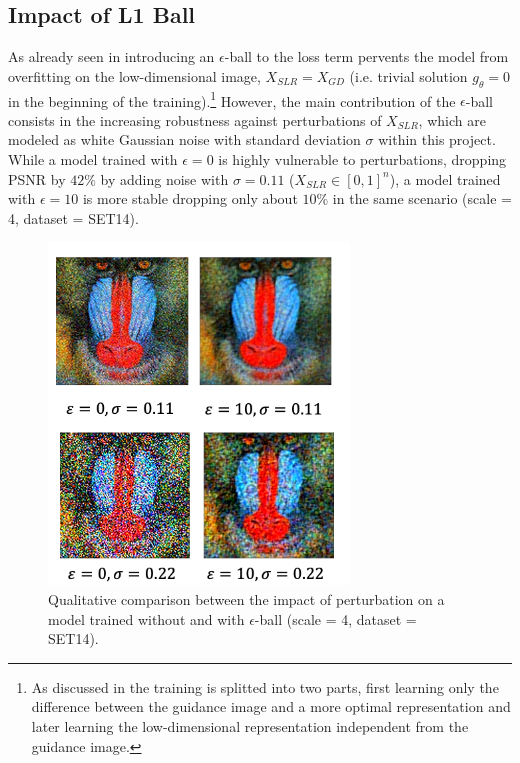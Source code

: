 \subsection{Impact of L1 Ball}
\label{sec:Experiments_EPS_BALL}
As already seen in  introducing an $\epsilon$-ball
to the loss term pervents the model from overfitting on the low-dimensional
image, $X_{SLR} = X_{GD}$ (i.e. trivial solution $g_\theta = 0$ in the
beginning of the training).\footnote{As discussed in 
the training is splitted into two parts, first learning only the difference
between the guidance image and a more optimal representation and later
learning the low-dimensional representation independent from the guidance
image.} However, the main contribution of the $\epsilon$-ball consists in the
increasing robustness against perturbations of $X_{SLR}$, which are modeled
as white Gaussian noise with standard deviation $\sigma$ within this project.
While a model trained with $\epsilon = 0$ is highly vulnerable to perturbations,
dropping \ac{PSNR} by $42 \%$ by adding noise with $\sigma = 0.11$ ($X_{SLR} \in
[0,1]^n$), a model trained with $\epsilon = 10$ is more stable dropping only
about $10 \%$ in the same scenario (scale = 4, dataset = SET14).

\begin{figure}[!htbp]
	\centering
	\includegraphics[width=8cm]{figures/epsball_qualitative_comp}
	\caption{Qualitative comparison between the impact of perturbation on a
  model trained without and with $\epsilon$-ball (scale = 4, dataset = SET14).}
  \label{fig:epsball_qualitative_comp}
\end{figure}

